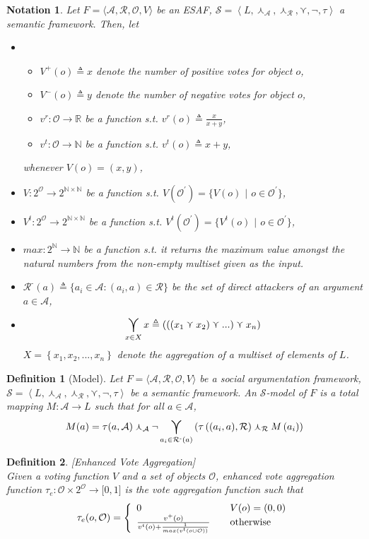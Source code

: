 \documentclass{article}
\newtheorem{definition}{Definition}
\newtheorem{notation}{Notation}
\newcommand{\nat}{\mathbb{N}}   %
\newcommand{\real}{\mathbb{R}}  %
\newcommand{\args}{\mathcal{A}} %
\newcommand{\att}{\mathcal{R}}  %
\newcommand{\valueset}{L}
\newcommand{\obj}{\mathcal{O}} %
\newcommand{\attackers}[1]{\att^\text{-}\left(#1\right)}
\newcommand{\safid}{F}               %
\newcommand{\safbodyO}{\langle \args, \att, \obj, V \rangle} %
\newcommand{\safO}{\safid = \safbodyO} %
\newcommand{\semid}{\mathcal{S}}        %
\newcommand{\sembodyNew}{\left\langle \valueset,\SAFand_\mathcal{A}, \SAFand_\mathcal{R},\SAFor,\lnot,\tau \right\rangle} %
\newcommand{\SAFand}{\curlywedge}     %
\newcommand{\SAFor}{\curlyvee}        %
\DeclareMathOperator*{\SAFOr}{\bigcurlyvee} %
\newcommand{\sem}{\mathcal{S}}
\begin{document}
\begin{notation}
Let $\safO$ be an ESAF, $\sem = \sembodyNew$ a semantic framework. Then, let
\begin{itemize}
\item
\begin{itemize}
\item $V^{+} (o) \triangleq x$ denote the number of positive votes for object $o$,
\item $V^{-} (o) \triangleq y$ denote the number of negative votes for object $o$,
\item $v^r: \obj \to \real$ be a function s.t. $v^r(o) \triangleq \frac{x}{x + y}$,
\item $v^t: \obj \to \nat$ be a function s.t. $v^t(o) \triangleq x + y$,  
\end{itemize}
whenever $V(o) = (x, y)$,
\\
\item $V: 2^\obj \to 2^{\nat \times \nat}$ be a function s.t. $V(\mathcal{O}^{'}) = \{V(o)$ $|$ $o \in \mathcal{O}^{'}\}$,
\item $V^{t}: 2^\obj \to 2^{\nat \times \nat}$ be a function s.t. $V^t(\mathcal{O}^{'}) = \{V^t(o)$ $|$ $o \in \mathcal{O}^{'}\}$,
\item $max: 2^{\nat} \to \nat$ be a function s.t. it returns the maximum value amongst the natural numbers from the non-empty multiset given as the input.
\item $\attackers{a} \triangleq \{a_i \in \args: (a_i, a) \in \att\}$ be the set of direct attackers of an argument $a \in \args$, 
\item$$\SAFOr_{x \in X} x \triangleq\left(\left(\left(  x_{1}\SAFor x_{2}\right) \SAFor...\right)\SAFor x_{n}\right)$$ $X=\left\{  x_{1},x_{2},...,x_{n}\right\}$ denote the aggregation of a multiset of elements of $\valueset$. 
\end{itemize}
\end{notation}

\begin{definition}[Model] 
\label{def:model}
  Let $\safO$ be a social argumentation framework, $\sem = \sembodyNew$ be a semantic framework. An $\semid$-model of $\safid$ is a total mapping $M : \args \rightarrow \valueset$ such that for all $a \in \args$,
  $$\displaystyle M(a) = \tau(a, \args ) \SAFand_\args \lnot \SAFOr_{a_i \in \attackers{a}} \left(\tau\left((a_i, a), \att \right) \SAFand_\att M\left(a_i\right)\right)$$
\end{definition}


\begin{definition}
\label{def:enhVoteAgg}
[Enhanced Vote Aggregation]
\\ Given a voting function $V$ and a set of objects $\obj$, enhanced vote aggregation function
$\tau_{e}:\obj  \times {2}^{\obj} \rightarrow\lbrack0,1]$ is the vote aggregation function such that
\[
\tau_{e}  (o, \mathcal{O})  = \left\{
\begin{array}
[c]{lll}
0 &  & V(o) = (0,0)\\
\frac{v^{+}(o)}{v^{t}(o)+\frac{1}{max(v^{t}(o \cup \mathcal{O}))}} &  & \text{otherwise}%
\end{array}
\right.
\]
\end{definition}
\end{document}

